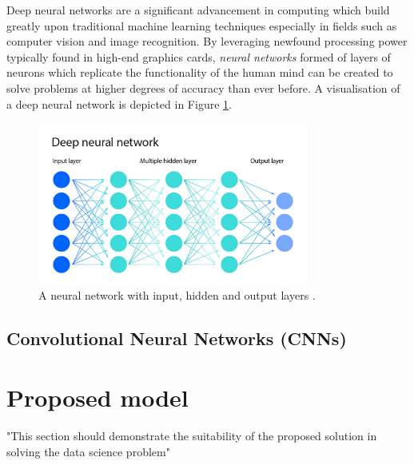 \documentclass[12pt]{report}
\begin{document}
Deep neural networks are a significant advancement in computing which build greatly upon traditional 
machine learning techniques especially in fields such as computer vision and image recognition. By leveraging newfound processing power 
typically found in high-end graphics cards, \textit{neural networks} formed of layers of neurons which replicate the functionality of 
the human mind can be created to solve problems at higher degrees of accuracy than ever before. A visualisation of a deep neural network 
is depicted in Figure \ref{fig:NeuralNetwork}.

\begin{figure}[H]
    \centering
    \includegraphics[width=0.8\textwidth]{Proposal/NeuralNetworkCropped.png}
    \caption{A neural network with input, hidden and output layers \autocite{ibmWhatNeuralNetwork2021}.\label{fig:NeuralNetwork}}
\end{figure}


\section{Convolutional Neural Networks (CNNs)}


\chapter{Proposed model}
"This section should demonstrate the suitability of
the proposed solution in solving the data science problem"
\end{document}
